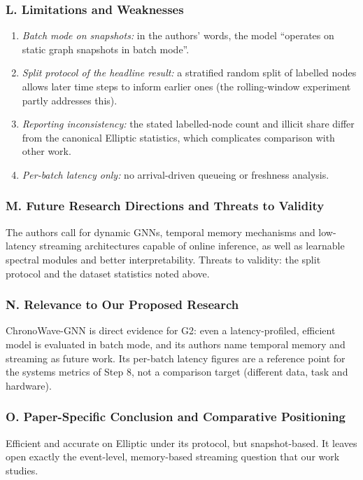 \documentclass[11pt,a4paper]{article}
\begin{document}
\subsubsection*{L. Limitations and Weaknesses}
\begin{enumerate}[leftmargin=*]
    \item \textit{Batch mode on snapshots:} in the authors' words, the model ``operates on static graph snapshots in batch mode''.
    \item \textit{Split protocol of the headline result:} a stratified random split of labelled nodes allows later time steps to inform earlier ones (the rolling-window experiment partly addresses this).
    \item \textit{Reporting inconsistency:} the stated labelled-node count and illicit share differ from the canonical Elliptic statistics, which complicates comparison with other work.
    \item \textit{Per-batch latency only:} no arrival-driven queueing or freshness analysis.
\end{enumerate}

\subsubsection*{M. Future Research Directions and Threats to Validity}
The authors call for dynamic GNNs, temporal memory mechanisms and low-latency streaming architectures capable of online inference, as well as learnable spectral modules and better interpretability. Threats to validity: the split protocol and the dataset statistics noted above.

\subsubsection*{N. Relevance to Our Proposed Research}
ChronoWave-GNN is direct evidence for G2: even a latency-profiled, efficient model is evaluated in batch mode, and its authors name temporal memory and streaming as future work. Its per-batch latency figures are a reference point for the systems metrics of Step 8, not a comparison target (different data, task and hardware).

\subsubsection*{O. Paper-Specific Conclusion and Comparative Positioning}
Efficient and accurate on Elliptic under its protocol, but snapshot-based. It leaves open exactly the event-level, memory-based streaming question that our work studies.
\end{document}
